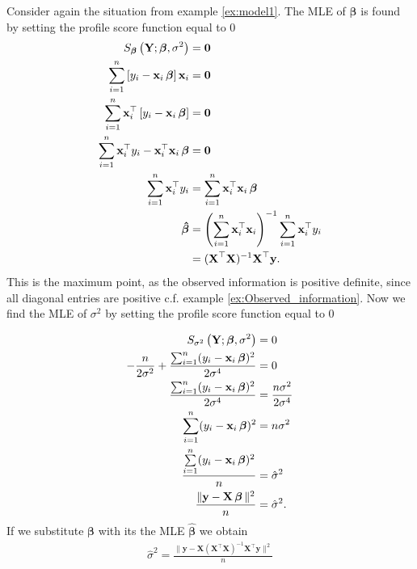\begin{example} \label{ex:MLE_for_model}
Consider again the situation from example \ref{ex:model1}. The MLE of $\boldsymbol{\beta}$ is found by setting the profile score function equal to $0$
\begin{align*}
    S_{\boldsymbol{\beta}}\left(\textbf{Y}; \boldsymbol{\beta}, \sigma^2 \right) &= \mathbf{0} \\
    \sum_{i=1}^n \left[ y_i - \textbf{x}_i \operatorname{\boldsymbol{\beta}} \right] \textbf{x}_i &= \mathbf{0} \\
    \sum_{i=1}^n \textbf{x}_i^\top \left[ y_i - \textbf{x}_i \operatorname{\boldsymbol{\beta}} \right] &= \mathbf{0} \\
    \sum_{i=1}^n  \textbf{x}_i^\top y_i - \textbf{x}_i^\top \textbf{x}_i \operatorname{\boldsymbol{\beta}} &= \mathbf{0} \\
    \sum_{i=1}^n  \textbf{x}_i^\top y_i &= \sum_{i=1}^n \textbf{x}_i^\top \textbf{x}_i \operatorname{\boldsymbol{\beta}} \\
    \operatorname{\boldsymbol{\hat{\beta}}} &= \left( \sum_{i=1}^n \textbf{x}_i^\top \textbf{x}_i \right)^{-1} \sum_{i=1}^n  \textbf{x}_i^\top y_i \\
    &= (\textbf{X}^\top\textbf{X})^{-1}\textbf{X}^\top \textbf{y}.
\end{align*}
This is the maximum point, as the observed information is positive definite, since all diagonal entries are positive c.f. example  \ref{ex:Observed_information}.
Now we find the MLE of $\sigma^2$ by setting the profile score function equal to $0$

\begin{align*}
     S_{\sigma^2}\left(\textbf{Y}; \boldsymbol{\beta}, \sigma^2 \right) &= 0 \\
      - \dfrac{n}{2 \sigma^2} + \dfrac{\sum_{i=1}^n (y_i -  \textbf{x}_i \operatorname{\boldsymbol{\beta}})^2}{2 \sigma^4} &= 0 \\
      \dfrac{\sum_{i=1}^n (y_i - \textbf{x}_i \operatorname{\boldsymbol{\beta}})^2}{2 \sigma^4} &= \dfrac{n\sigma^2}{2 \sigma^4} \\
      \sum_{i=1}^n (y_i - \textbf{x}_i \operatorname{\boldsymbol{\beta}})^2 &= n\sigma^2 \\
      \dfrac{\sum\limits_{i=1}^{n} (y_i - \textbf{x}_i \operatorname{\boldsymbol{\beta}})^2}{n} &= \hat{\sigma}^2 \\
      \frac{\| \textbf{y} - \textbf{X}\operatorname{\boldsymbol{\beta}}\|^2}{n} &= \hat{\sigma}^2.
\end{align*}
If we substitute $\boldsymbol{\beta}$ with its the MLE $\hat{\boldsymbol{\beta}}$ we obtain
\begin{align}\label{eq:MLE_for_sigma}
     \hat{\sigma}^2 = \frac{\| \textbf{y} - \textbf{X}(\textbf{X}^\top\textbf{X})^{-1}\textbf{X}^\top \textbf{y}\|^2}{n}
\end{align}



\end{example}
